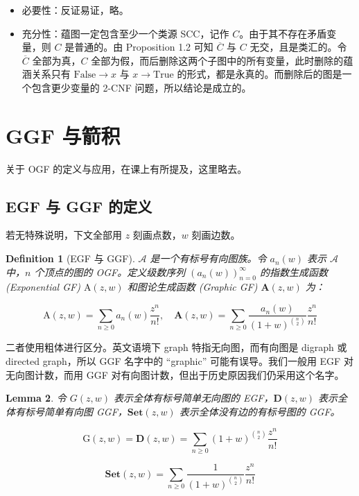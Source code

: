 \documentclass[10pt,a4paper,oneside]{article}
\newtheorem{definition}{Definition}[section]
\newtheorem{lemma}[definition]{Lemma}
\begin{document}
\begin{itemize}
    \item 必要性：反证易证，略。
    \item 充分性：蕴图一定包含至少一个类源 SCC，记作 $C$。由于其不存在矛盾变量，则 $C$ 是普通的。由 Proposition 1.2 可知 $\overline{C}$ 与 $C$ 无交，且是类汇的。令 $\overline{C}$ 全部为真，$C$ 全部为假，而后删除这两个子图中的所有变量，此时删除的蕴涵关系只有 $\mathrm{False} \to x$ 与 $x \to \mathrm{True}$ 的形式，都是永真的。而删除后的图是一个包含更少变量的 2-CNF 问题，所以结论是成立的。
\end{itemize}

\section{GGF 与箭积}

关于 OGF 的定义与应用，在课上有所提及，这里略去。

\subsection{EGF 与 GGF 的定义}

若无特殊说明，下文全部用 $z$ 刻画点数，$w$ 刻画边数。

\begin{definition}[EGF 与 GGF]
    $\mathcal{A}$ 是一个有标号有向图族。令 $a_n(w)$ 表示 $\mathcal{A}$ 中，$n$ 个顶点的图的 OGF。定义级数序列 $(a_n(w))_{n=0}^{\infty}$ 的指数生成函数 (Exponential GF) $\mathrm A(z,w)$ 和图论生成函数 (Graphic GF) $\mathbf{A}(z,w)$ 为：

$$
\mathrm A(z,w) = \sum_{n\ge 0} a_n(w)\dfrac{z^n}{n!},\quad 
\mathbf{A}(z,w) = \sum_{n\ge 0} \dfrac{a_n(w)}{(1+w)^{\binom n2}}\dfrac{z^n}{n!}
$$

\end{definition}

二者使用粗体进行区分。英文语境下 graph 特指无向图，而有向图是 digraph 或 directed graph，所以 GGF 名字中的 “graphic” 可能有误导。我们一般用 EGF 对无向图计数，而用 GGF 对有向图计数，但出于历史原因我们仍采用这个名字。

\begin{lemma}
令 $G(z,w)$ 表示全体有标号简单无向图的 EGF，$\mathbf{D}(z,w)$ 表示全体有标号简单有向图 GGF，$\mathbf{Set}(z,w)$ 表示全体没有边的有标号图的 GGF。

\[\mathrm G(z,w) = \mathbf{D}(z,w) = \sum_{n\ge 0} (1+w)^{\binom n2} \dfrac{z^n}{n!}\]

\[\mathbf{Set}(z,w) = \sum_{n\ge 0} \dfrac{1}{(1+w)^{\binom n2}} \dfrac{z^n}{n!}\]

\end{lemma}
\end{document}
